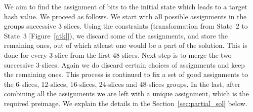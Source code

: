 \documentclass[runningheads]{llncs}
\begin{document}
 We aim to find the assignment of bits to the initial state which leads to a target hash value. We proceed as follows. We start with all possible assignments in the groups successive $3$ slices. Using the constraints (transformation from State~2 to State~3 [Figure~\ref{atk}]), we discard some of the assignments, and store the remaining ones, out of which atleast one would be a part of the solution. This is done for every $3$-slice from the first $48$ slices. Next step is to merge the two successive $3$-slices. Again we do discard certain choices of assignments and keep the remaining ones. This process is continued to fix a set of good assignments to the $6$-slices, $12$-slices, $16$-slices, $24$-slices and $48$-slices groups. In the last, after combining all the assignments we are left with a unique assignment, which is the required preimage. We explain the details in the Section~\ref{sec:partial_sol} below. 
\end{document}
